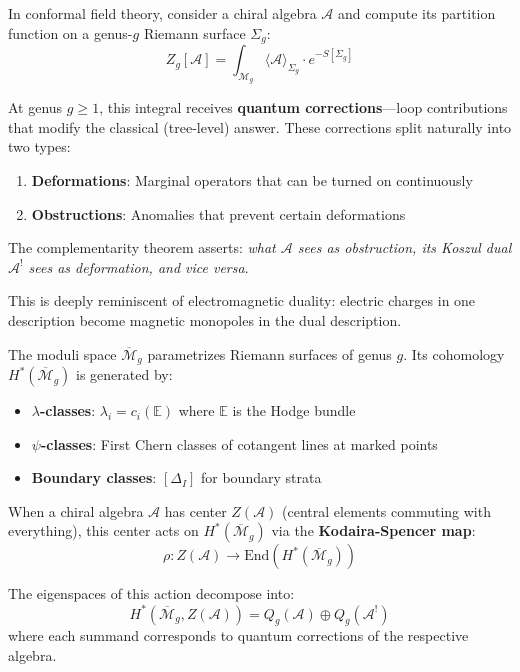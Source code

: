 \begin{motivation}
In conformal field theory, consider a chiral algebra $\mathcal{A}$ and compute its
partition function on a genus-$g$ Riemann surface $\Sigma_g$:
\begin{equation}
Z_g[\mathcal{A}] = \int_{\mathcal{M}_g} \langle \mathcal{A} \rangle_{\Sigma_g} 
\cdot e^{-S[\Sigma_g]}
\end{equation}

At genus $g \geq 1$, this integral receives \textbf{quantum corrections}---loop 
contributions that modify the classical (tree-level) answer. These corrections split 
naturally into two types:
\begin{enumerate}
\item \textbf{Deformations}: Marginal operators that can be turned on continuously
\item \textbf{Obstructions}: Anomalies that prevent certain deformations
\end{enumerate}

The complementarity theorem asserts: \emph{what $\mathcal{A}$ sees as obstruction, 
its Koszul dual $\mathcal{A}^!$ sees as deformation, and vice versa}.

This is deeply reminiscent of electromagnetic duality: electric charges in one 
description become magnetic monopoles in the dual description.
\end{motivation}

\begin{motivation}
The moduli space $\overline{\mathcal{M}}_g$ parametrizes Riemann surfaces of genus $g$.
Its cohomology $H^*(\overline{\mathcal{M}}_g)$ is generated by:
\begin{itemize}
\item \textbf{$\lambda$-classes}: $\lambda_i = c_i(\mathbb{E})$ where $\mathbb{E}$ 
is the Hodge bundle
\item \textbf{$\psi$-classes}: First Chern classes of cotangent lines at marked points
\item \textbf{Boundary classes}: $[\Delta_I]$ for boundary strata
\end{itemize}

When a chiral algebra $\mathcal{A}$ has center $Z(\mathcal{A})$ (central elements 
commuting with everything), this center acts on $H^*(\overline{\mathcal{M}}_g)$ via 
the \textbf{Kodaira-Spencer map}:
\begin{equation}
\rho: Z(\mathcal{A}) \to \text{End}(H^*(\overline{\mathcal{M}}_g))
\end{equation}

The eigenspaces of this action decompose into:
\begin{equation}
H^*(\overline{\mathcal{M}}_g, Z(\mathcal{A})) = Q_g(\mathcal{A}) \oplus Q_g(\mathcal{A}^!)
\end{equation}
where each summand corresponds to quantum corrections of the respective algebra.
\end{motivation}

